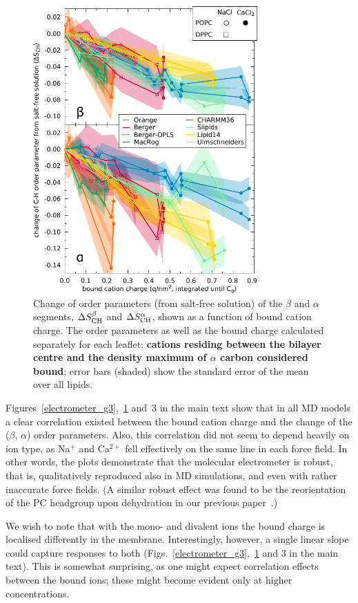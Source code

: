 \documentclass[twoside,twocolumn,9pt]{article}
\begin{document}
\begin{figure}[t]
  \centering
  \includegraphics[width=8.6cm]{../Fig/dOP_vs_boundCationCharge_Ca.pdf}
  \caption{\label{electrometer_ca}
    Change of order parameters (from salt-free solution) of the $\beta$ and $\alpha$ segments,
    $\Delta S_{\rm{CH}}^{\beta}$ and $\Delta S_{\rm{CH}}^{\alpha}$,
    shown as a function of bound cation charge.
    The order parameters as well as the bound charge calculated separately for
    each leaflet; {\bf cations residing between the bilayer centre and the density maximum of $\alpha$ carbon
    considered bound}; error bars (shaded) show the standard error of the mean over all lipids.
    }
\end{figure}

Figures~\ref{electrometer_g3},~\ref{electrometer_ca} and~3 in the main text show that in all MD models a clear correlation existed between the bound cation charge and the change of the ($\beta$, $\alpha$) order parameters. Also, this correlation did not seem to depend heavily on ion type, as Na$^+$ and Ca$^{2+}$ fell effectively on the same line in each force field.
In other words, the plots demonstrate that the molecular electrometer is robust, that is, qualitatively reproduced also in MD simulations, and even with rather inaccurate force fields. (A similar robust effect was found to be the reorientation of the PC headgroup upon dehydration in our previous paper~\cite{botan15}.)

We wish to note that with the mono- and divalent ions the bound charge is localised differently in the membrane.
Interestingly, however, a single linear slope could capture responses to both (Figs.~\ref{electrometer_g3},~\ref{electrometer_ca} and 3 in the main text).
This is somewhat surprising, as one might expect correlation effects between the bound ions;
these might become evident only at higher concentrations.
\end{document}
